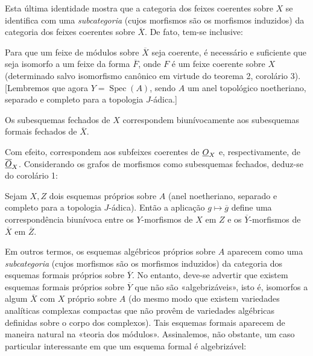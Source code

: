 Esta última identidade mostra que a categoria dos feixes coerentes sobre
$X$ se identifica com uma \emph{subcategoria} (cujos morfismos são os
morfismos induzidos) da categoria dos feixes coerentes sobre
$\overline X$. De fato, tem-se inclusive:

 Para que um feixe de módulos sobre $\overline X$ seja
coerente, é necessário e suficiente que seja isomorfo a um feixe da forma
$\overline F$, onde $F$ é um feixe coerente sobre $X$ (determinado salvo
isomorfismo canônico em virtude do teorema 2, corolário 3). [Lembremos que
agora $Y=\operatorname{Spec}(A)$, sendo $A$ um anel topológico noetheriano,
separado e completo para a topologia $J$-ádica.]

 Os subesquemas fechados de $X$ correspondem
biunívocamente aos subesquemas formais fechados de $\overline X$.

Com efeito, correspondem aos subfeixes coerentes de $\underline{O}_X$ e,
respectivamente, de $\overline{\underline{O}}_X$. Considerando os grafos de morfismos
como subesquemas fechados, deduz-se do corolário 1:

 Sejam $X,Z$ dois esquemas próprios sobre $A$ (anel
noetheriano, separado e completo para a topologia $J$-ádica). Então a
aplicação $g\longmapsto\overline g$ define uma correspondência biunívoca entre
os $Y$-morfismos de $X$ em $Z$ e os $\overline Y$-morfismos de $\overline X$
em $\overline Z$.

Em outros termos, os esquemas algébricos próprios sobre $A$ aparecem como uma
\emph{subcategoria} (cujos morfismos são os morfismos induzidos) da
categoria dos esquemas formais próprios sobre $\overline Y$. No entanto,
deve-se advertir que existem esquemas formais próprios sobre $\overline Y$ que
não são «algebrizáveis», isto é, isomorfos a algum $\overline X$ com $X$
próprio sobre $A$ (do mesmo modo que existem variedades analíticas complexas
compactas que não provêm de variedades algébricas definidas sobre o corpo
dos complexos). Tais esquemas formais aparecem de maneira natural na
«teoria dos módulos». Assinalemos, não obstante, um caso particular interessante em
que um esquema formal é algebrizável:

